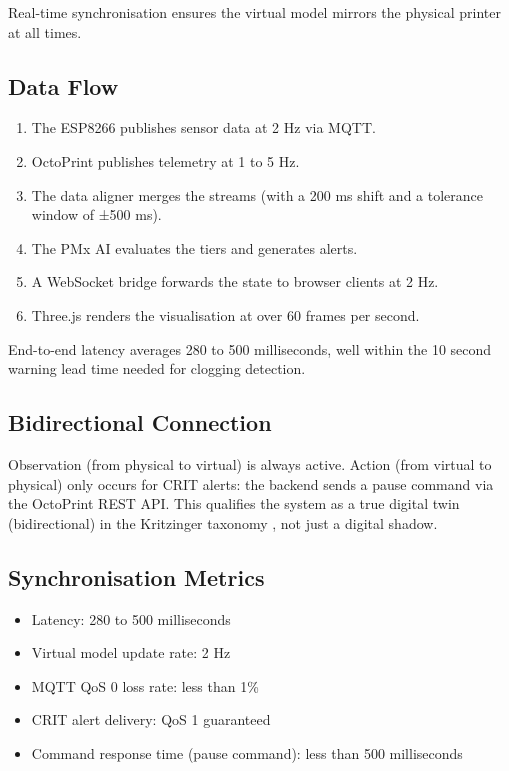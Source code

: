 Real-time synchronisation ensures the virtual model mirrors the physical printer at all times.

\subsection{Data Flow}
\begin{enumerate}
    \item The ESP8266 publishes sensor data at 2 Hz via MQTT.
    \item OctoPrint publishes telemetry at 1 to 5 Hz.
    \item The data aligner merges the streams (with a 200 ms shift and a tolerance window of ±500 ms).
    \item The PMx AI evaluates the tiers and generates alerts.
    \item A WebSocket bridge forwards the state to browser clients at 2 Hz.
    \item Three.js renders the visualisation at over 60 frames per second.
\end{enumerate}
End-to-end latency averages 280 to 500 milliseconds, well within the 10 second warning lead time needed for clogging detection.

\subsection{Bidirectional Connection}

Observation (from physical to virtual) is always active. Action (from virtual to physical) only occurs for CRIT alerts: the backend sends a pause command via the OctoPrint REST API. This qualifies the system as a true digital twin (bidirectional) in the Kritzinger taxonomy \cite{kritzinger2018digital}, not just a digital shadow.

\subsection{Synchronisation Metrics}
\begin{itemize}
    \item Latency: 280 to 500 milliseconds
    \item Virtual model update rate: 2 Hz
    \item MQTT QoS 0 loss rate: less than 1\%
    \item CRIT alert delivery: QoS 1 guaranteed
    \item Command response time (pause command): less than 500 milliseconds
\end{itemize}

\endinput
